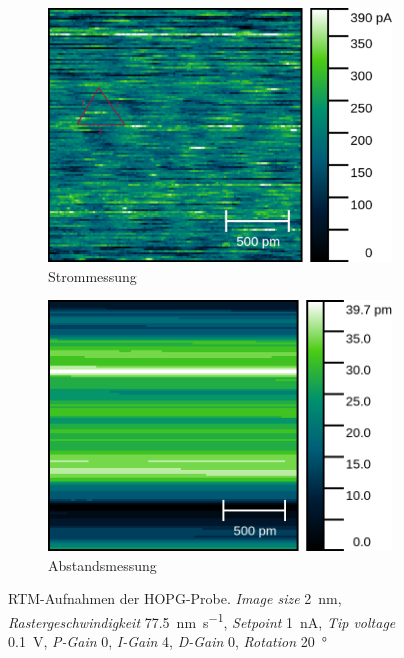 \begin{figure}
	\centering
	\begin{subfigure}{0.45\linewidth}
		\centering
		\includegraphics[width=\linewidth]{figs/HOPG10628_lines.png}
		\caption{Strommessung}
		\label{fig:hopg_rtm_4nm_2_cur}
	\end{subfigure}
	\hspace{.5cm}
	\begin{subfigure}{0.45\linewidth}
		\centering
		\includegraphics[width=\linewidth]{figs/HOPG10628_height.png}
		\caption{Abstandsmessung}
		\label{fig:hopg_rtm_4nm_2_height}
	\end{subfigure}
	\caption{RTM-Aufnahmen der HOPG-Probe. \textit{Image size} \SI{2}{\nano \meter},
	\textit{Rastergeschwindigkeit} \SI{77.5}{\nm\per \second}, \textit{Setpoint} \SI{1}{\nano \ampere},
	\textit{Tip voltage} \SI{0.1}{\volt}, \textit{P-Gain} \num{0}, \textit{I-Gain} \num{4},
	\textit{D-Gain} \num{0}, \textit{Rotation} \SI{20}{\degree}}
	\label{fig:hopg_rtm_2}
\end{figure}